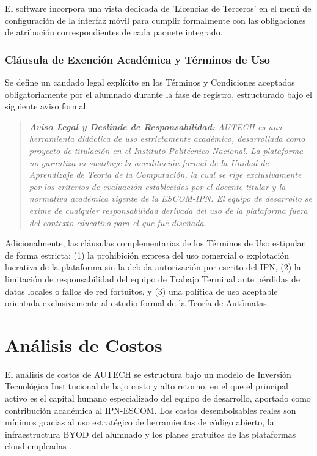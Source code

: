El software incorpora una vista dedicada de 'Licencias de Terceros' en el menú de configuración de la interfaz móvil para cumplir formalmente con las obligaciones de atribución correspondientes de cada paquete integrado.

\subsubsection{Cláusula de Exención Académica y Términos de Uso}
Se define un candado legal explícito en los Términos y Condiciones aceptados obligatoriamente por el alumnado durante la fase de registro, estructurado bajo el siguiente aviso formal:

\begin{quote}
    \small \textit{\textbf{Aviso Legal y Deslinde de Responsabilidad:} AUTECH es una herramienta didáctica de uso estrictamente académico, desarrollada como proyecto de titulación en el Instituto Politécnico Nacional. La plataforma no garantiza ni sustituye la acreditación formal de la Unidad de Aprendizaje de Teoría de la Computación, la cual se rige exclusivamente por los criterios de evaluación establecidos por el docente titular y la normativa académica vigente de la ESCOM-IPN. El equipo de desarrollo se exime de cualquier responsabilidad derivada del uso de la plataforma fuera del contexto educativo para el que fue diseñada.}
\end{quote}

Adicionalmente, las cláusulas complementarias de los Términos de Uso estipulan de forma estricta: (1) la prohibición expresa del uso comercial o explotación lucrativa de la plataforma sin la debida autorización por escrito del IPN, (2) la limitación de responsabilidad del equipo de Trabajo Terminal ante pérdidas de datos locales o fallos de red fortuitos, y (3) una política de uso aceptable orientada exclusivamente al estudio formal de la Teoría de Autómatas.

\section{Análisis de Costos}
\label{sec:analisis_costos}

El análisis de costos de AUTECH se estructura bajo un modelo de Inversión Tecnológica Institucional de bajo costo y alto retorno, en el que el principal activo es el capital humano especializado del equipo de desarrollo, aportado como contribución académica al IPN-ESCOM. Los costos desembolsables reales son mínimos gracias al uso estratégico de herramientas de código abierto, la infraestructura BYOD del alumnado y los planes gratuitos de las plataformas cloud empleadas \cite{pressman2020}.

